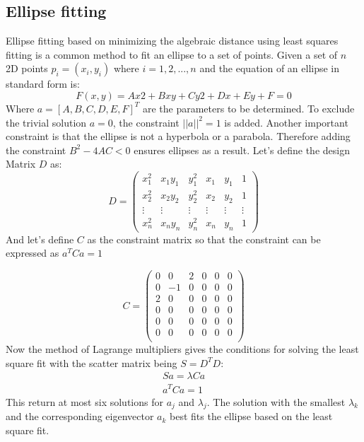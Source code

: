     \subsection{Ellipse fitting}
    \label{subsubsec:ellipsefitting}
    Ellipse fitting \cite{fitzgibbon_direct_2000} based on minimizing the algebraic distance using least squares fitting is a common method to fit an ellipse to a set of points. Given a set of $n$ 2D points $p_i = (x_i, y_i)$ where $i = 1,2,...,n$ and the equation of an ellipse in standard form is: 
    \begin{equation}
        F(x,y)=Ax2+Bxy+Cy2+Dx+Ey+F=0
        \label{eq:ellipse_standard}
    \end{equation}
    Where $a=[A, B, C, D, E, F]^T$ are the parameters to be determined. To exclude the trivial solution $a=0$, the constraint $||a||^2=1$ is added. Another important constraint is that the ellipse is not a hyperbola or a parabola. Therefore adding the constraint $B^2-4AC<0$ ensures ellipses as a result.
    Let's define the design Matrix $D$ as: 
    \begin{equation}
        D = \begin{pmatrix}
        x_1^2 & x_1y_1 & y_1^2 & x_1 & y_1 & 1 \\
        x_2^2 & x_2y_2 & y_2^2 & x_2 & y_2 & 1 \\
        \vdots & \vdots & \vdots & \vdots & \vdots & \vdots \\
        x_n^2 & x_ny_n & y_n^2 & x_n & y_n & 1 
        \end{pmatrix}
        \label{DesignMatrix}
        \end{equation}
    And let's define $C$ as the constraint matrix so that the constraint can be expressed as $a^TCa=1$

        \begin{equation}
            C = \begin{pmatrix}
            0 & 0 & 2 & 0 & 0 & 0 \\
            0 & -1 & 0 & 0 & 0 & 0 \\
            2 & 0 & 0 & 0 & 0 & 0 \\
            0 & 0 & 0 & 0 & 0 & 0 \\
            0 & 0 & 0 & 0 & 0 & 0 \\
            0 & 0 & 0 & 0 & 0 & 0 \\
            \end{pmatrix} \label{eq:C}
        \end{equation}
Now the method of Lagrange multipliers \cite{gander_least_1980} gives the conditions for solving the least square fit with the scatter matrix being $S=D^TD$: 
\begin{gather}
    Sa = \lambda Ca \\
    a^TCa=1
\end{gather}
This return at most six solutions for $a_j$ and $\lambda_j$. The solution with the smallest $\lambda_k$ and the corresponding eigenvector $a_k$ best fits the ellipse based on the least square fit. 

